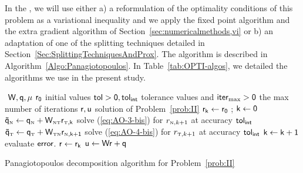 In the \chapterorreport{}, we will use either a) a reformulation of the optimality conditions of this problem as a variational inequality and we apply the fixed point algorithm and the extra gradient algorithm of Section~\ref{sec:numericalmethods,vi} or b) an adaptation of one of the splitting techniques detailed in Section~\ref{Sec:SplittingTechniquesAndProx}. The algorithm is described in Algorithm~\ref{Algo:Panagiotopoulos}.
In Table~\ref{tab:OPTI-algos}, we detailed the algorithms we use in the present study.

\begin{algorithm}
  \begin{algorithmic}
    {\sf
      \STATE $ $ 
      \REQUIRE $\sf W,q,\mu$
      \REQUIRE $\sf r_0$ initial values
      \REQUIRE $\sf tol >0, tol_{{int}}$  tolerance values and $\sf iter_{\max}  >0$ the max number of iterations
      \ENSURE  $\sf r,u$ solution of Problem~\ref{prob:II}
      \STATE $\sf r_{k} \leftarrow r_0 $ ; $\sf k \leftarrow 0$ 
      \STATE $\sf \tilde q_{\hbox{\tiny{N}}} \leftarrow q_{\hbox{\tiny{N}}} + W_{{\hbox{\tiny{N}}}{\hbox{\tiny{T}}}}r_{{\hbox{\tiny{T}}},k}$
      \STATE solve (\ref{eq:AO-3-bis}) for $r_{{\hbox{\tiny{N}}},k+1}$ at accuracy $\sf tol_{{int}}$
      \STATE $\sf  \tilde q_{\hbox{\tiny{T}}} \leftarrow q_{\hbox{\tiny{T}}} + W_{{\hbox{\tiny{T}}}{\hbox{\tiny{N}}}}r_{{\hbox{\tiny{N}}},k+1}$
      \STATE solve (\ref{eq:AO-4-bis}) for $r_{{\hbox{\tiny{T}}},k+1}$ at accuracy $\sf tol_{{int}}$
      \STATE $\sf k \leftarrow k+1$
      \STATE evaluate $\sf error$.
      \ENDWHILE
      \STATE $\sf r \leftarrow r_{k}$ 
      \STATE $\sf u \leftarrow W r + q$ 
    }
  \end{algorithmic}
  \caption{Panagiotopoulos decomposition algorithm for Problem~\ref{prob:II}}  \label{Algo:Panagiotopoulos}
\end{algorithm}


